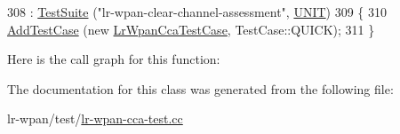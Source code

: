 \begin{DoxyCode}
308   : \hyperlink{classns3_1_1TestSuite_a904b0c40583b744d30908aeb94636d1a}{TestSuite} (\textcolor{stringliteral}{"lr-wpan-clear-channel-assessment"}, \hyperlink{classns3_1_1TestSuite_a1ebfcab34ec8161e085e8e3a1855eae0a3885375a3787abf60431f8454b3cadbd}{UNIT})
309 \{
310   \hyperlink{classns3_1_1TestCase_a3718088e3eefd5d6454569d2e0ddd835}{AddTestCase} (\textcolor{keyword}{new} \hyperlink{classLrWpanCcaTestCase}{LrWpanCcaTestCase}, TestCase::QUICK);
311 \}
\end{DoxyCode}


Here is the call graph for this function\+:




The documentation for this class was generated from the following file\+:\begin{DoxyCompactItemize}
\item 
lr-\/wpan/test/\hyperlink{lr-wpan-cca-test_8cc}{lr-\/wpan-\/cca-\/test.\+cc}\end{DoxyCompactItemize}
